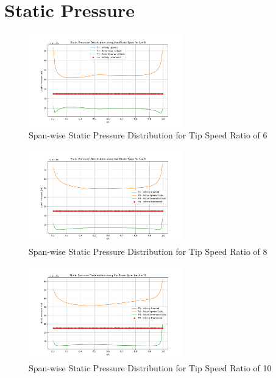 \section{Static Pressure}
\begin{figure}[H]
    \centering
    \includegraphics[width=0.6\textwidth]{Figures/pres_static_6.png}
    \caption{Span-wise Static Pressure Distribution for Tip Speed Ratio of 6}
    \label{fig:span-wise static pressure distribution - lambda 6}
\end{figure}
\begin{figure}[H]
    \centering
    \includegraphics[width=0.6\textwidth]{Figures/pres_static_8.png}
    \caption{Span-wise Static Pressure Distribution for Tip Speed Ratio of 8}
    \label{fig:span-wise static pressure distribution - lambda 8}
\end{figure}
\begin{figure}[H]
    \centering
    \includegraphics[width=0.6\textwidth]{Figures/pres_static_10.png}
    \caption{Span-wise Static Pressure Distribution for Tip Speed Ratio of 10}
    \label{fig:span-wise static pressure distribution - lambda 10}
\end{figure}

